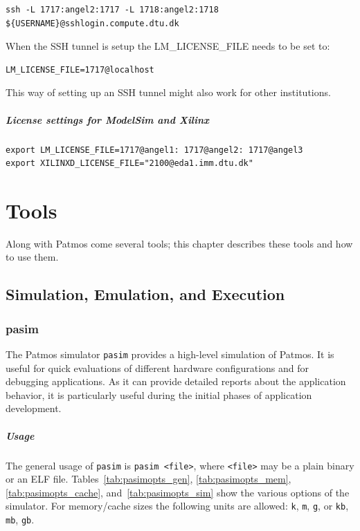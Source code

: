 \documentclass[a4paper,fontsize=10pt,twoside,DIV15,BCOR12mm,headinclude=true,footinclude=false,pagesize,bibtotoc]{scrbook}
\begin{document}
\begin{verbatim}
ssh -L 1717:angel2:1717 -L 1718:angel2:1718 ${USERNAME}@sshlogin.compute.dtu.dk
\end{verbatim}

When the SSH tunnel is setup the LM\_LICENSE\_FILE needs to be set to:
\begin{verbatim}
LM_LICENSE_FILE=1717@localhost
\end{verbatim}

This way of setting up an SSH tunnel might also work for other institutions.

\paragraph{License settings for ModelSim and Xilinx}

\begin{verbatim}
export LM_LICENSE_FILE=1717@angel1: 1717@angel2: 1717@angel3
export XILINXD_LICENSE_FILE="2100@eda1.imm.dtu.dk"
\end{verbatim}

\chapter{Tools}

Along with Patmos come several tools; this chapter describes these
tools and how to use them.

\section{Simulation, Emulation, and Execution}

\subsection{pasim}

The Patmos simulator \texttt{pasim} provides a high-level simulation
of Patmos. It is useful for quick evaluations of different hardware
configurations and for debugging applications. As it can provide
detailed reports about the application behavior, it is particularly
useful during the initial phases of application development.

\paragraph{Usage} The general usage of \texttt{pasim} is \texttt{pasim
  <file>}, where \texttt{<file>} may be a plain binary or an ELF
file. Tables~\ref{tab:pasimopts_gen}, \ref{tab:pasimopts_mem},
\ref{tab:pasimopts_cache}, and~\ref{tab:pasimopts_sim} show the
various options of the simulator. For memory/cache sizes the following
units are allowed: \texttt{k}, \texttt{m}, \texttt{g}, or \texttt{kb},
\texttt{mb}, \texttt{gb}.
\end{document}
